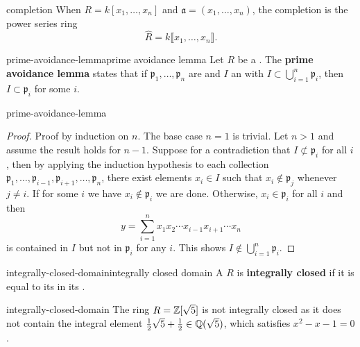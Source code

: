 \begin{example}{completion}
    When $R = k[x_1, \ldots, x_n]$ and $\mathfrak{a} = (x_1, \ldots, x_n)$, the completion is the power series ring
    \[ \widehat{R} = k\llbracket x_1, \ldots, x_n \rrbracket . \]
\end{example}

\begin{topic}{prime-avoidance-lemma}{prime avoidance lemma}
    Let $R$ be a . The \textbf{prime avoidance lemma} states that if $\mathfrak{p}_1, \ldots, \mathfrak{p}_n$ are  and $I$ an  with $I \subset \bigcup_{i = 1}^{n} \mathfrak{p}_i$, then $I \subset \mathfrak{p}_i$ for some $i$.
\end{topic}

\begin{example}{prime-avoidance-lemma}
    \begin{proof}
        Proof by induction on $n$. The base case $n = 1$ is trivial. Let $n > 1$ and assume the result holds for $n - 1$. Suppose for a contradiction that $I \not\subset \mathfrak{p}_i$ for all $i$, then by applying the induction hypothesis to each collection $\mathfrak{p}_1, \ldots, \mathfrak{p}_{i - 1}, \mathfrak{p}_{i + 1}, \ldots, \mathfrak{p}_n$, there exist elements $x_i \in I$ such that $x_i \not\in \mathfrak{p}_j$ whenever $j \ne i$. If for some $i$ we have $x_i \not\in \mathfrak{p}_i$ we are done. Otherwise, $x_i \in \mathfrak{p}_i$ for all $i$ and then
        \[ y = \sum_{i = 1}^{n} x_1 x_2 \cdots x_{i - 1} x_{i + 1} \cdots x_n \]
        is contained in $I$ but not in $\mathfrak{p}_i$ for any $i$. This shows $I \not\in \bigcup_{i = 1}^{n} \mathfrak{p}_i$.
    \end{proof}
\end{example}

\begin{topic}{integrally-closed-domain}{integrally closed domain}
    A  $R$ is \textbf{integrally closed} if it is equal to its  in its .
\end{topic}

\begin{example}{integrally-closed-domain}
    The ring $R = \mathbb{Z}[\sqrt{5}]$ is not integrally closed as it does not contain the integral element $\tfrac{1}{2} \sqrt{5} + \tfrac{1}{2} \in \mathbb{Q}(\sqrt{5})$, which satisfies $x^2 - x - 1 = 0$.
\end{example}

